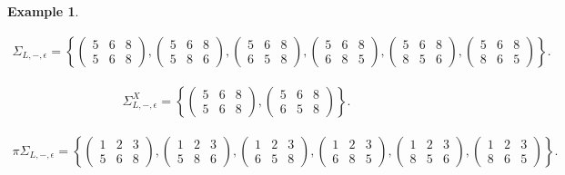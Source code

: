 \documentclass[11pt]{amsart}
\theoremstyle{plain}
\theoremstyle{definition}
\newtheorem{example}[theorem]{Example}
\theoremstyle{remark}
\numberwithin{equation}{section}
\numberwithin{theorem}{section}
\numberwithin{figure}{section}
\begin{document}
\begin{example}
\begin{small}
\begin{align*}
\Sigma_{L,-,\epsilon}=\left\{\left(\begin{array}{ccc}5&6&8\\5&6&8\end{array}\right),\left(\begin{array}{ccc}5&6&8\\5&8&6\end{array}\right),\left(\begin{array}{ccc}5&6&8\\6&5&8\end{array}\right),\left(\begin{array}{ccc}5&6&8\\6&8&5\end{array}\right),\left(\begin{array}{ccc}5&6&8\\8&5&6\end{array}\right),\left(\begin{array}{ccc}5&6&8\\8&6&5\end{array}\right)\right\}.
\end{align*}
\end{small}
\begin{small}
\begin{align*}
\Sigma_{L,-,\epsilon}^{X}=\left\{\left(\begin{array}{ccc}5&6&8\\5&6&8\end{array}\right),\left(\begin{array}{ccc}5&6&8\\6&5&8\end{array}\right)\right\}.
\end{align*}
\end{small}
\begin{small}
\begin{align*}
\pi\Sigma_{L,-,\epsilon}=\left\{\left(\begin{array}{ccc}1&2&3\\5&6&8\end{array}\right),\left(\begin{array}{ccc}1&2&3\\5&8&6\end{array}\right),\left(\begin{array}{ccc}1&2&3\\6&5&8\end{array}\right),\left(\begin{array}{ccc}1&2&3\\6&8&5\end{array}\right),\left(\begin{array}{ccc}1&2&3\\8&5&6\end{array}\right),\left(\begin{array}{ccc}1&2&3\\8&6&5\end{array}\right)\right\}.

\end{align*}
\end{small}
\end{example}
\end{document}
